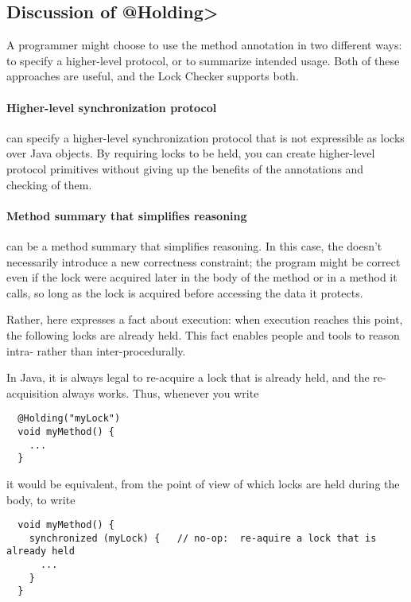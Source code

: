     

\subsection{Discussion of \<@Holding>}

A programmer might choose to use the  method annotation in
two different ways:  to specify a higher-level protocol, or to summarize
intended usage.  Both of these approaches are useful, and the Lock Checker
supports both.

\paragraph{Higher-level synchronization protocol}

   can specify a higher-level synchronization protocol that
  is not expressible as locks over Java objects.  By requiring locks to be
  held, you can create higher-level protocol primitives without giving up
  the benefits of the annotations and checking of them.

\paragraph{Method summary that simplifies reasoning}

   can be a method summary that simplifies reasoning.  In
  this case, the  doesn't necessarily introduce a new
  correctness constraint; the program might be correct even if the lock
  were acquired later in the body of the method or in a method it calls, so
  long as the lock is acquired before accessing the data it protects.

  Rather, here  expresses a fact about execution:  when
  execution reaches this point, the following locks are already held.  This
  fact enables people and tools to reason intra- rather than
  inter-procedurally.

  In Java, it is always legal to re-acquire a lock that is already held,
  and the re-acquisition always works.  Thus, whenever you write 

\begin{Verbatim}
  @Holding("myLock")
  void myMethod() {
    ...
  }
\end{Verbatim}

\noindent
it would be equivalent, from the point of view of which locks are held
during the body, to write

\begin{Verbatim}
  void myMethod() {
    synchronized (myLock) {   // no-op:  re-aquire a lock that is already held
      ...
    }
  }
\end{Verbatim}


